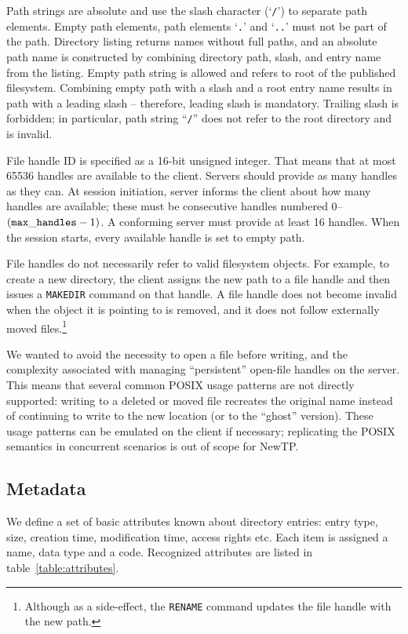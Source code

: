 Path strings are absolute and use the slash character (`{\tt /}') to separate path elements. Empty path
elements, path elements `{\tt .}' and `{\tt ..}' must not be part of the path. Directory listing returns names
without full paths, and an absolute path name is constructed by combining directory path, slash, and entry
name from the listing. Empty path string is allowed and refers to root of the published filesystem. Combining
empty path with a slash and a root entry name results in path with a leading slash -- therefore, leading slash
is mandatory. Trailing slash is forbidden; in particular, path string ``{\tt /}'' does not refer to the root
directory and is invalid.

File handle ID is specified as a 16-bit unsigned integer. That means that at most 65536 handles are available
to the client. Servers should provide as many handles as they can. At session initiation, server informs the
client about how many handles are available; these must be consecutive handles numbered 0--$({\tt max\_handles}
- 1)$. A conforming server must provide at least 16 handles. When the session starts, every available handle is
set to empty path.

File handles do not necessarily refer to valid filesystem objects. For example, to create a new directory,
the client assigns the new path to a file handle and then issues a {\tt MAKEDIR} command on that handle.
A file handle does not become invalid when the object it is pointing to is removed, and it does not follow
externally moved files.\footnote{Although as a side-effect, the {\tt RENAME} command updates the file handle
with the new path.}

We wanted to avoid the necessity to open a file before writing, and the complexity associated with managing
``persistent'' open-file handles on the server. This means that several common POSIX usage patterns are not
directly supported: writing to a deleted or moved file recreates the original name instead of continuing to
write to the new location (or to the ``ghost'' version). These usage patterns can be emulated on the client if
necessary; replicating the POSIX semantics in concurrent scenarios is out of scope for NewTP.

%

\subsection{Metadata}

We define a set of basic attributes known about directory entries: entry type, size, creation time,
modification time, access rights etc. Each item is assigned a name, data type and a code. Recognized
attributes are listed in table~\ref{table:attributes}.

